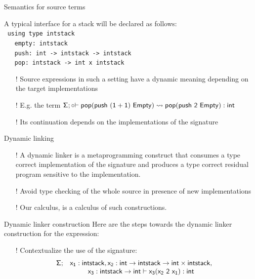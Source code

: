 \documentclass{beamer}
\begin{document}
   \begin{frame}{Semantics for source terms}
    
      
     A typical interface for a stack will be declared as follows:\\
    \texttt{
        using type intstack\\
       \ \ \    empty: intstack\\
       \ \ \    push: int -> intstack -> intstack\\
       \ \ \    pop: intstack -> int x intstack\\
    }
    \begin{itemize}
      \item[!] Source expressions in such a setting have a 
      dynamic meaning depending on the target implementations
      \item[!] E.g. the term ${\sf \Sigma}; {\sf \circ {\vdash pop (push \ (1+1) \ Empty)\rightsquigarrow pop (push \ 2 \ Empty) :int}}$
      \item [!] Its continuation depends on the implementations of the signature
    \end{itemize}
  \end{frame}
  \begin{frame}{Dynamic linking}
    \begin{itemize}
      \item 
      [!]A dynamic linker is a metaprogramming construct that consumes a type correct implementation of 
      the signature and produces a type correct residual program sensitive to the implementation.
      \item[!] Avoid type checking of the whole source in presence of new implementations 
      \item[!] Our calculus, is a calculus of such constructions.
    \end{itemize}
  \end{frame}
    \begin{frame} {Dynamic linker construction}
      Here are the steps towards the dynamic linker construction for the expression:
      \begin{itemize}
       \item[!] Contextualize the use of the signature:
      \[\begin{array}{c c} {\sf \Sigma;}& {\sf x_1:intstack, x_2:int\rightarrow intstack\rightarrow int\times intstack,}\\ & {\sf x_3:intstack\rightarrow int \vdash x_3 (x_2 \ 2\ x_1):int} \end{array} \]
       
      \end{itemize}

  \end{frame}
\end{document}
